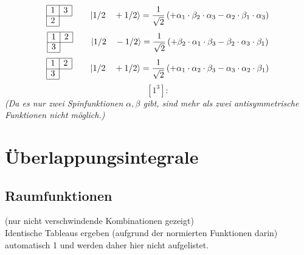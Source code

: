 \documentclass[fleqn]{article}%
\begin{document}
\vspace{0.25cm}%
\begin{dmath*}\begin{array}{|c|c|} \hline 1 & 3\\ \cline{1-2} 2\\ \cline{1-1} \end{array} \qquad \ket{ 1/2 \quad  +1/2 } = \frac{1}{\sqrt{2}} \left( + \alpha_{1} \cdot \beta_{2} \cdot \alpha_{3}  - \alpha_{2} \cdot \beta_{1} \cdot \alpha_{3}\right) \end{dmath*}%
\vspace{0.25cm}%
\begin{dmath*}\begin{array}{|c|c|} \hline 1 & 2\\ \cline{1-2} 3\\ \cline{1-1} \end{array} \qquad \ket{ 1/2 \quad  -1/2 } = \frac{1}{\sqrt{2}} \left( + \beta_{2} \cdot \alpha_{1} \cdot \beta_{3}  - \beta_{2} \cdot \alpha_{3} \cdot \beta_{1}\right) \end{dmath*}%
\vspace{0.25cm}%
\begin{dmath*}\begin{array}{|c|c|} \hline 1 & 2\\ \cline{1-2} 3\\ \cline{1-1} \end{array} \qquad \ket{ 1/2 \quad  +1/2 } = \frac{1}{\sqrt{2}} \left( + \alpha_{1} \cdot \alpha_{2} \cdot \beta_{3}  - \alpha_{3} \cdot \alpha_{2} \cdot \beta_{1}\right) \end{dmath*}%
\vspace{0.25cm}%
\vspace{0.25cm}%
\vspace{0.25cm}%
\begin{dmath*}\left[1^3\right]:\end{dmath*}%
\vspace{0.25cm}%
\textit{(Da es nur zwei Spinfunktionen $\alpha, \beta$ gibt, sind mehr als zwei antisymmetrische Funktionen nicht möglich.)}%
\vspace{0.25cm}%
\newpage%
\section{Überlappungsintegrale}%
\label{sec:berlappungsintegrale}%

%
\subsection{Raumfunktionen}%
\label{subsec:Raumfunktionen}%
 (nur nicht verschwindende Kombinationen gezeigt)\\Identische Tableaus ergeben (aufgrund der normierten Funktionen darin) automatisch 1 und werden daher hier nicht aufgelistet.
\end{document}
